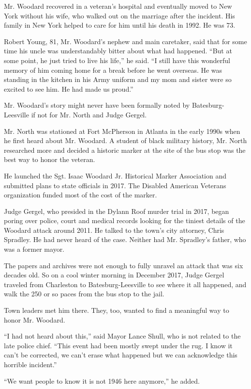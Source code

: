 Mr. Woodard recovered in a veteran's hospital and eventually moved to
New York without his wife, who walked out on the marriage after the
incident. His family in New York helped to care for him until his death
in 1992. He was 73.

Robert Young, 81, Mr. Woodard's nephew and main caretaker, said that for
some time his uncle was understandably bitter about what had happened.
``But at some point, he just tried to live his life,'' he said. ``I
still have this wonderful memory of him coming home for a break before
he went overseas. He was standing in the kitchen in his Army uniform and
my mom and sister were so excited to see him. He had made us proud.''

Mr. Woodard's story might never have been formally noted by
Batesburg-Leesville if not for Mr. North and Judge Gergel.

Mr. North was stationed at Fort McPherson in Atlanta in the early 1990s
when he first heard about Mr. Woodard. A student of black military
history, Mr. North researched more and decided a historic marker at the
site of the bus stop was the best way to honor the veteran.

He launched the Sgt. Isaac Woodard Jr. Historical Marker Association and
submitted plans to state officials in 2017. The Disabled American
Veterans organization funded most of the cost of the marker.

Judge Gergel, who presided in the Dylann Roof murder trial in 2017,
began poring over police, court and medical records looking for the
tiniest details of the Woodard attack around 2011. He talked to the
town's city attorney, Chris Spradley. He had never heard of the case.
Neither had Mr. Spradley's father, who was a former mayor.

The papers and archives were not enough to fully unravel an attack that
was six decades old. So on a cool winter morning in December 2017, Judge
Gergel traveled from Charleston to Batesburg-Leesville to see where it
all happened, and walk the 250 or so paces from the bus stop to the
jail.

Town leaders met him there. They, too, wanted to find a meaningful way
to honor Mr. Woodard.

``I had not heard about this,'' said Mayor Lance Shull, who is not
related to the late police chief. ``This event had been mostly swept
under the rug. I know it can't be corrected, we can't erase what
happened but we can acknowledge this horrible incident.''

``We want people to know it is not 1946 here anymore,'' he added.

